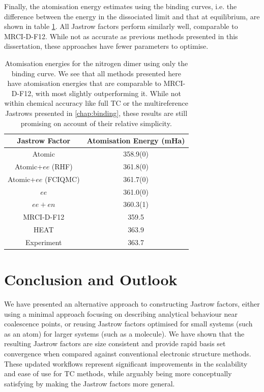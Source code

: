 Finally, the atomisation energy estimates using the binding curves, i.e. the difference between the energy in the dissociated limit and that at equilibrium, are shown in table \ref{tbl:binding-atomisation-energies-uni}. All Jastrow factors perform similarly well, comparable to MRCI-D-F12. While not as accurate as previous methods presented in this dissertation, these approaches have fewer parameters to optimise.

\begin{table}[htbp]
    \centering
        \begin{tabular}{c|c}
            Jastrow Factor & Atomisation Energy (mHa) \\
            \hline
            Atomic & 358.9(0) \\
            Atomic+$ee$ (RHF) & 361.8(0) \\
            Atomic+$ee$ (FCIQMC) & 361.7(0)\\
            $ee$ & 361.0(0) \\
            $ee+en$ & 360.3(1) \\
            \bottomrule
            MRCI-D-F12 & 359.5 \\
            HEAT\supercite{fellerSurvey2008} & 363.9 \\
            Experiment\supercite{leroyAccurate2006} & 363.7
        \end{tabular}
    \caption{Atomisation energies for the nitrogen dimer using only the binding curve. We see that all methods presented here have atomisation energies that are comparable to MRCI-D-F12, with most slightly outperforming it. While not within chemical accuracy like full TC or the multireference Jastrows presented in \autoref{chap:binding}, these results are still promising on account of their relative simplicity.
    }
    \label{tbl:binding-atomisation-energies-uni}
\end{table}

\section{Conclusion and Outlook}

We have presented an alternative approach to constructing Jastrow factors, either using a minimal approach focusing on describing analytical behaviour near coalescence points, or reusing Jastrow factors optimised for small systems (such as an atom) for larger systems (such as a molecule). We have shown that the resulting Jastrow factors are size consistent and provide rapid basis set convergence when compared against conventional electronic structure methods.
These updated workflows represent significant improvements in the scalability and ease of use for TC methods, while arguably being more conceptually satisfying by making the Jastrow factors more general.

